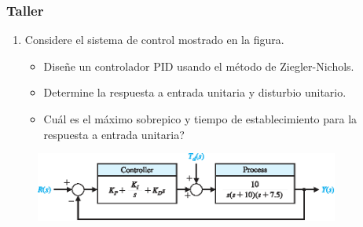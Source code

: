 \documentclass[aspectratio=169,handout]{beamer}
\theoremstyle{definition}
\theoremstyle{plain}
\theoremstyle{remark}
\newcounter{saveenumi}
\newcommand{\seti}{\setcounter{saveenumi}{\value{enumi}}}
\begin{document}
\begin{frame}[c]\frametitle{Taller}
	\begin{enumerate}
		\item Considere el sistema de control mostrado en la figura.
		\begin{itemize}
			\item Diseñe un controlador PID usando el método de Ziegler-Nichols.
			\item Determine la respuesta a entrada unitaria y disturbio unitario.
			\item Cuál es el máximo sobrepico y tiempo de establecimiento para la respuesta a entrada unitaria?
		\end{itemize}
		\seti
	\end{enumerate}
	\begin{figure}
		\includegraphics[width=10cm]{images/ejercicio1.eps}
	\end{figure}
\end{frame}
\end{document}
